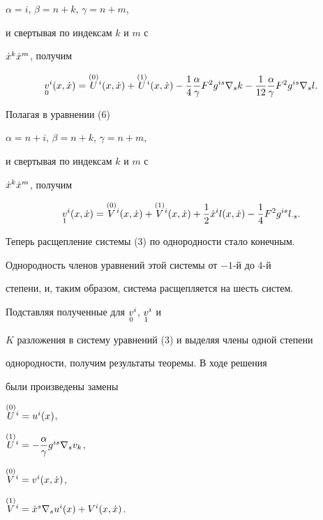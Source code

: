 \begin{pf}
$\alpha = i$, $\beta = n + k$, $\gamma = n + m$, 


и свертывая по индексам $k$ и $m$ с 


$\xt^{k}\xt^{m}$, получим


$$


\sd{v}{0}^{i}(x,\xt) = 


\up{U}{(0)}{}^i(x,\xt) + 


\up{U}{(1)}{}^i(x,\xt) -


\frac{1}{4}\frac{\alpha}{\gamma}F^{2}g^{is}\nabla_{s}k - 


\frac{1}{12}\frac{\alpha}{\gamma}F^{2}g^{is}\nabla_{s}l.


$$


Полагая в уравнении (6)\;


$\alpha = n + i$, $\beta = n + k$, $\gamma = n + m$, 


и свертывая по индексам $k$ и $m$ с 


$\xt^{k}\xt^{m}$, получим


$$


\sd{v}{1}^{i}(x,\xt) = 


\up{V}{(0)}{}^i(x,\xt) + 


\up{V}{(1)}{}^i(x,\xt) +


\frac{1}{2}\xt^{i}l(x,\xt) - 


\frac{1}{4}F^{2}g^{is}l_{\cdot s}.  


$$


Теперь расщепление системы (3) по однородности стало конечным.


Однородность членов уравнений этой системы от $- 1$-й до $4$-й 


степени, и, таким образом, система расщепляется на шесть систем.


Подставляя полученные для $\sd{v}{0}^{i}$, $\sd{v}{1}^{i}$ и


$K$ разложения в систему уравнений (3) и выделяя члены одной степени


однородности, получим результаты теоремы. В ходе решения 


были произведены замены


$\up{U}{(0)}{}^i = u^{i}(x)$,


$\up{U}{(1)}{}^i = 


-\dfrac{\alpha}{\gamma} g^{is}\nabla_{s}v_{k}$,


$\up{V}{(0)}{}^i = v^{i}(x,\xt)$,


$\up{V}{(1)}{}^i = 


\xt^{s}\nabla_{s}u^{i}(x) + V^{i}(x,\xt)$.


\end{pf}





